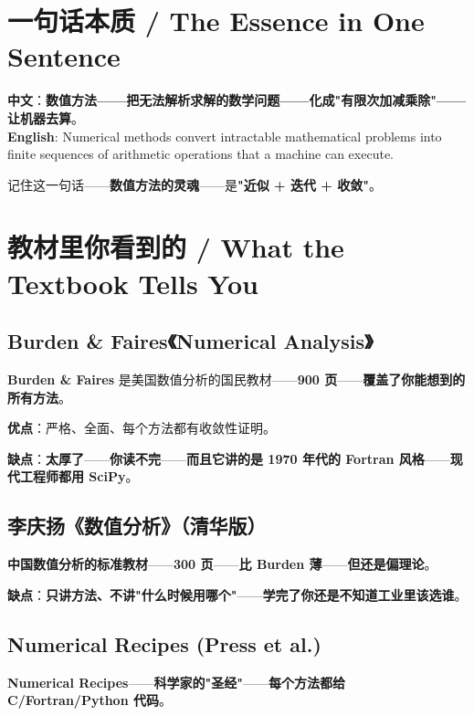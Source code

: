 \section{一句话本质 / The Essence in One Sentence}

\begin{tcolorbox}[essbox={一句话本质}]
\textbf{中文}：\textbf{数值方法——把无法解析求解的数学问题——化成"有限次加减乘除"——让机器去算}。\\[6pt]
\textbf{English}: Numerical methods convert intractable mathematical problems into finite sequences of arithmetic operations that a machine can execute.
\end{tcolorbox}

记住这一句话——\textbf{数值方法的灵魂}——是\textbf{"近似 + 迭代 + 收敛"}。

\section{教材里你看到的 / What the Textbook Tells You}

\subsection{Burden \& Faires《Numerical Analysis》}

\textbf{Burden \& Faires} 是美国数值分析的国民教材——\textbf{900 页}——\textbf{覆盖了你能想到的所有方法}。

\textbf{优点}：严格、全面、每个方法都有收敛性证明。

\textbf{缺点}：\textbf{太厚了}——\textbf{你读不完}——\textbf{而且它讲的是 1970 年代的 Fortran 风格}——\textbf{现代工程师都用 SciPy}。

\subsection{李庆扬《数值分析》（清华版）}

\textbf{中国数值分析的标准教材}——\textbf{300 页}——\textbf{比 Burden 薄}——\textbf{但还是偏理论}。

\textbf{缺点}：\textbf{只讲方法、不讲"什么时候用哪个"}——\textbf{学完了你还是不知道工业里该选谁}。

\subsection{Numerical Recipes (Press et al.)}

\textbf{Numerical Recipes}——\textbf{科学家的"圣经"}——\textbf{每个方法都给 C/Fortran/Python 代码}。

